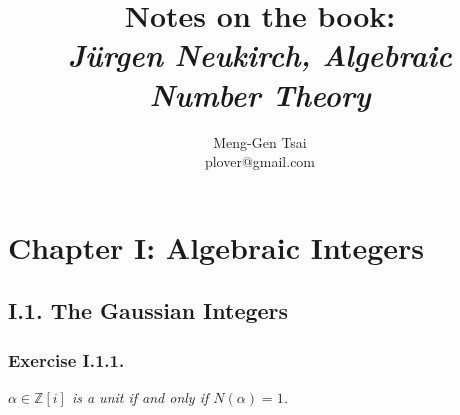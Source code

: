 \documentclass{article}
\title{\textbf{Notes on the book: \\\emph{J\"{u}rgen Neukirch, Algebraic Number Theory}}}
\author{Meng-Gen Tsai \\ plover@gmail.com}
\begin{document}
\maketitle
\tableofcontents











\newpage
\section*{Chapter I: Algebraic Integers \\}



\subsection*{I.1. The Gaussian Integers \\}



\subsubsection*{Exercise I.1.1.}
\emph{$\alpha \in \mathbb{Z}[i]$ is a unit if and only if $N(\alpha) = 1$.} \\
\end{document}

